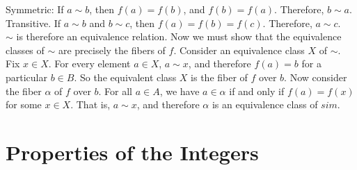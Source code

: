 \documentclass[12pt]{article}
\begin{document}
\begin{itemize}
Symmetric: If $a \sim b$, then $f(a) = f(b)$, and $f(b) = f(a)$. Therefore, $b \sim a$. \\
Transitive. If $a \sim b$ and $b \sim c$, then $f(a) = f(b) = f(c)$. Therefore, $a \sim c$. \\
$\sim$ is therefore an equivalence relation. Now we must show that the equivalence classes of $\sim$ are precisely the fibers of $f$. Consider an equivalence class $X$ of $\sim$. Fix $x \in X$. For every element $a \in X$, $a \sim x$, and therefore $f(a) = b$ for a particular $b \in B$. So the equivalent class $X$ is the fiber of $f$ over $b$. Now consider the fiber $\alpha$ of $f$ over $b$. For all $a \in A$, we have $a \in \alpha$ if and only if $f(a) = f(x)$ for some $x \in X$. That is, $a \sim x$, and therefore $\alpha$ is an equivalence class of $sim$.
\end{itemize}

\section{Properties of the Integers}
\end{document}
